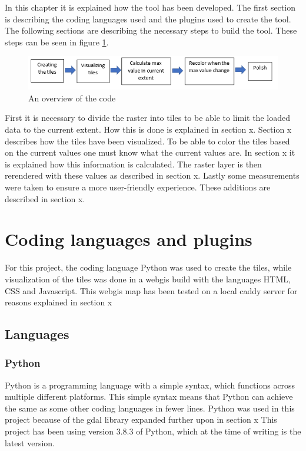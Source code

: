 In this chapter it is explained how the tool has been developed. The first section is describing the coding languages used and the plugins used to create the tool. The following sections are describing the necessary steps to build the tool. These steps can be seen in figure \ref{DevelopmentSteps}.

\begin{figure} [H]
	\centering
	\includegraphics[width=1\textwidth]{Pictures/DevelopmentSteps}
	\caption{An overview of the code}
	\label{DevelopmentSteps}
\end{figure}

First it is necessary to divide the raster into tiles to be able to limit the loaded data to the current extent. How this is done is explained in section x. Section x describes how the tiles have been visualized. To be able to color the tiles based on the current values one must know what the current values are. In section x it is explained how this information is calculated. The raster layer is then rerendered with these values as described in section x. Lastly some measurements were taken to ensure a more user-friendly experience. These additions are described in section x. 


\chapter{Coding languages and plugins}
For this project, the coding language Python was used to create the tiles, while visualization of the tiles was done in a webgis build with the languages HTML, CSS and Javascript. This webgis map has been tested on a local caddy server for reasons explained in section x

\section{Languages}
\subsection*{Python}
Python is a programming language with a simple syntax, which functions across multiple different platforms. This simple syntax means that Python can achieve the same as some other coding languages in fewer lines.\citep{WhatIsPython}
Python was used in this project because of the gdal library expanded further upon in section x
This project has been using version 3.8.3 of Python, which at the time of writing is the latest version. \citep{PythonVersion}
